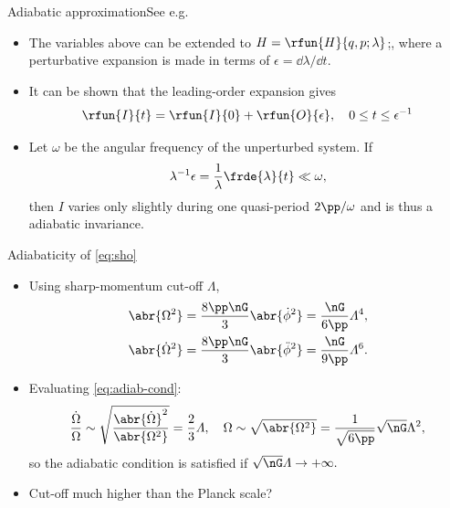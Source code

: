 \documentclass{beamer}
\begin{document}
\begin{frame}{Adiabatic approximation}{See e.g.\ \cite{Henrard_1993}}
\begin{itemize}
\item The variables above can be extended to $H = \rfun{H}{q, p; \lambda}$;,
where a perturbative expansion is made in terms of $\epsilon = \dd \lambda / \dd 
t$.
\item It can be shown that the leading-order expansion gives
\begin{equation}
\rfun{I}{t} = \rfun{I}{0} +  \rfun{O}{\epsilon},\quad 0 \le t \le 
\epsilon^{-1}
\end{equation}
\item Let $\omega$ be the angular frequency of the unperturbed system. If
\begin{equation}
\lambda^{-1} \epsilon = \frac{1}{\lambda}\frde{\lambda}{t} \ll \omega,
\label{eq:adiab-cond}
\end{equation}
then $I$ varies only slightly during one quasi-period $2\pp/\omega$ and is 
thus a \alert{adiabatic invariance}.

\end{itemize}

\end{frame}


\begin{frame}{Adiabaticity of \cref{eq:sho}}
\begin{itemize}
\item Using sharp-momentum cut-off $\varLambda$,
\begin{align}
\abr{\Omega^2} &= \frac{8\pp\nG}{3} \abr{{\dot{\phi}}^2} =
\frac{\nG}{6\pp} \varLambda^4,\\
\abr{{\dot\Omega}^2} &= \frac{8\pp\nG}{3} 
\abr{{\ddot{\phi}}^2} = \frac{\nG}{9\pp} \varLambda^6.
\end{align}
\item Evaluating \cref{eq:adiab-cond}:
\begin{equation}
\frac{\dot\Omega}{\Omega} \sim
\sqrt{\frac{\abr{\dot\Omega}^2}{\abr{\Omega^2}}} = \frac{2}{3} 
\varLambda,\quad \Omega \sim \sqrt{\abr{\Omega^2}} = \frac{1}{\sqrt{6\pp}}
\sqrt{\nG}\Lambda^2,
\end{equation}
so the adiabatic condition is satisfied if $\sqrt{\nG}\varLambda \to +\infty.$
\item Cut-off much higher than the Planck scale?


\end{itemize}

\end{frame}
\end{document}
